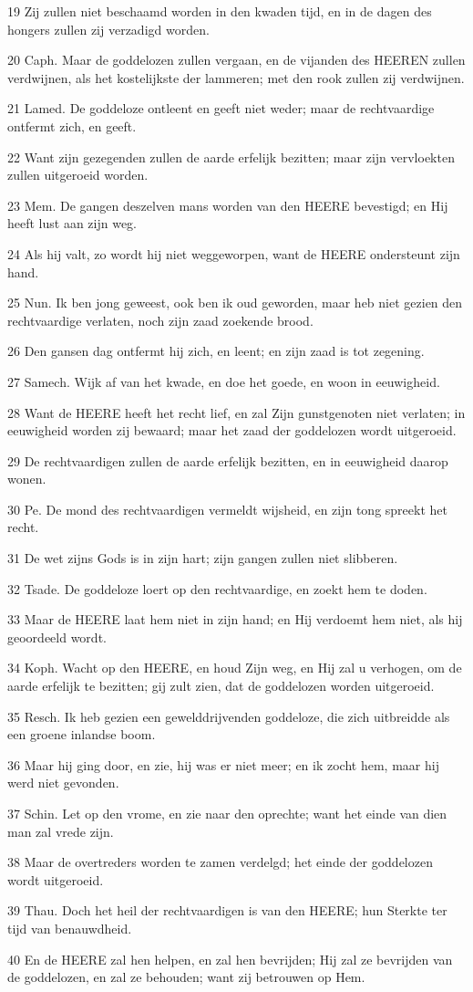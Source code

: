 \par 19 Zij zullen niet beschaamd worden in den kwaden tijd, en in de dagen des hongers zullen zij verzadigd worden.
\par 20 Caph. Maar de goddelozen zullen vergaan, en de vijanden des HEEREN zullen verdwijnen, als het kostelijkste der lammeren; met den rook zullen zij verdwijnen.
\par 21 Lamed. De goddeloze ontleent en geeft niet weder; maar de rechtvaardige ontfermt zich, en geeft.
\par 22 Want zijn gezegenden zullen de aarde erfelijk bezitten; maar zijn vervloekten zullen uitgeroeid worden.
\par 23 Mem. De gangen deszelven mans worden van den HEERE bevestigd; en Hij heeft lust aan zijn weg.
\par 24 Als hij valt, zo wordt hij niet weggeworpen, want de HEERE ondersteunt zijn hand.
\par 25 Nun. Ik ben jong geweest, ook ben ik oud geworden, maar heb niet gezien den rechtvaardige verlaten, noch zijn zaad zoekende brood.
\par 26 Den gansen dag ontfermt hij zich, en leent; en zijn zaad is tot zegening.
\par 27 Samech. Wijk af van het kwade, en doe het goede, en woon in eeuwigheid.
\par 28 Want de HEERE heeft het recht lief, en zal Zijn gunstgenoten niet verlaten; in eeuwigheid worden zij bewaard; maar het zaad der goddelozen wordt uitgeroeid.
\par 29 De rechtvaardigen zullen de aarde erfelijk bezitten, en in eeuwigheid daarop wonen.
\par 30 Pe. De mond des rechtvaardigen vermeldt wijsheid, en zijn tong spreekt het recht.
\par 31 De wet zijns Gods is in zijn hart; zijn gangen zullen niet slibberen.
\par 32 Tsade. De goddeloze loert op den rechtvaardige, en zoekt hem te doden.
\par 33 Maar de HEERE laat hem niet in zijn hand; en Hij verdoemt hem niet, als hij geoordeeld wordt.
\par 34 Koph. Wacht op den HEERE, en houd Zijn weg, en Hij zal u verhogen, om de aarde erfelijk te bezitten; gij zult zien, dat de goddelozen worden uitgeroeid.
\par 35 Resch. Ik heb gezien een gewelddrijvenden goddeloze, die zich uitbreidde als een groene inlandse boom.
\par 36 Maar hij ging door, en zie, hij was er niet meer; en ik zocht hem, maar hij werd niet gevonden.
\par 37 Schin. Let op den vrome, en zie naar den oprechte; want het einde van dien man zal vrede zijn.
\par 38 Maar de overtreders worden te zamen verdelgd; het einde der goddelozen wordt uitgeroeid.
\par 39 Thau. Doch het heil der rechtvaardigen is van den HEERE; hun Sterkte ter tijd van benauwdheid.
\par 40 En de HEERE zal hen helpen, en zal hen bevrijden; Hij zal ze bevrijden van de goddelozen, en zal ze behouden; want zij betrouwen op Hem.


